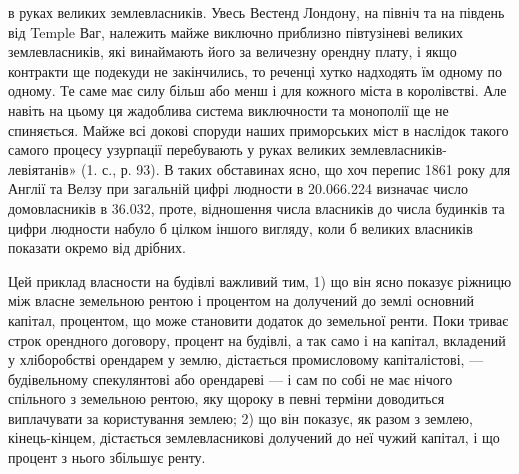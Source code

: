 в руках великих землевласників. Увесь Вестенд Лондону, на північ та на південь
від Temple Ваг, належить майже виключно приблизно півтузіневі великих
землевласників, які винаймають його за величезну орендну плату, і якщо
контракти ще подекуди не закінчились, то реченці хутко надходять їм одному по
одному. Те саме має силу більш або менш і для кожного міста в королівстві. Але
навіть на цьому ця жадоблива система виключности та монополії ще не спиняється. Майже всі докові
споруди наших приморських міст в наслідок такого
самого процесу узурпації перебувають у руках великих землевласників-левіятанів» (1. с., р. 93). В
таких обставинах ясно, що хоч перепис 1861 року для
Англії та Велзу при загальній цифрі людности в 20.066.224 визначає число
домовласників в 36.032, проте, відношення числа власників до числа будинків
та цифри людности набуло б цілком іншого вигляду, коли б великих власників
показати окремо від дрібних.

Цей приклад власности на будівлі важливий тим, 1) що він ясно показує
ріжницю між власне земельною рентою і процентом на долучений до землі
основний капітал, процентом, що може становити додаток до земельної ренти.
Поки триває строк орендного договору, процент на будівлі, а так само і на
капітал, вкладений у хліборобстві орендарем у землю, дістається промисловому капіталістові, —
будівельному спекулянтові або орендареві — і сам по собі
не має нічого спільного з земельною рентою, яку щороку в певні терміни доводиться виплачувати за
користування землею; 2) що він показує, як разом з
землею, кінець-кінцем, дістається землевласникові долучений до неї чужий капітал, і що процент з
нього збільшує ренту.


